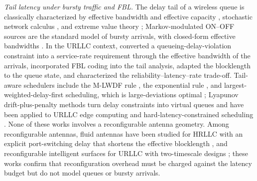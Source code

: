 \documentclass[journal]{IEEEtran}
\begin{document}
\emph{Tail latency under bursty traffic and FBL.} The delay tail of a wireless queue is classically characterized by effective bandwidth and effective capacity \cite{Chang1994,Kelly1996,Wu2003,Ozmen2016}, stochastic network calculus \cite{AlZubaidy2016,Schiessl2018}, and extreme value theory \cite{Bennis2018}; Markov-modulated ON--OFF sources are the standard model of bursty arrivals, with closed-form effective bandwidths \cite{Anick1982,Elwalid1993}. In the URLLC context, \cite{She2018CrossLayer} converted a queueing-delay-violation constraint into a service-rate requirement through the effective bandwidth of the arrivals, \cite{Gursoy2013,Schiessl2018} incorporated FBL coding into the tail analysis, \cite{Zhao2022QueueAware} adapted the blocklength to the queue state, and \cite{Li2024RLR} characterized the reliability--latency--rate trade-off. Tail-aware schedulers include the M-LWDF rule \cite{Andrews2001}, the exponential rule \cite{Shakkottai2002EXP}, and largest-weighted-delay-first scheduling, which is large-deviations optimal \cite{Stolyar2001LWDF}; Lyapunov drift-plus-penalty methods \cite{Neely2010,Neely2013DelayNUM} turn delay constraints into virtual queues and have been applied to URLLC edge computing \cite{Liu2019MEC} and hard-latency-constrained scheduling \cite{Zhang2025HRL}. None of these works involves a reconfigurable antenna geometry. Among reconfigurable antennas, fluid antennas have been studied for HRLLC with an explicit port-switching delay that shortens the effective blocklength \cite{Zhu2026FASHRLLC}, and reconfigurable intelligent surfaces for URLLC with two-timescale designs \cite{Peng2024TwoTimescaleRIS}; these works confirm that reconfiguration overhead must be charged against the latency budget but do not model queues or bursty arrivals.
\end{document}
